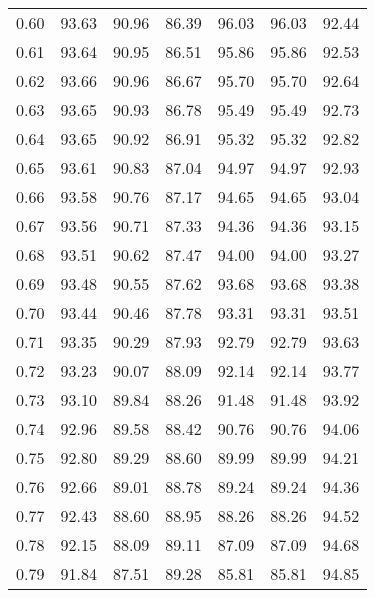 \begin{tabular}{|c|c|c|c|c|c|c|}
      0.60 &     93.63 &     90.96 &      86.39 &   96.03 &      96.03 &         92.44 \\
      0.61 &     93.64 &     90.95 &      86.51 &   95.86 &      95.86 &         92.53 \\
      0.62 &     93.66 &     90.96 &      86.67 &   95.70 &      95.70 &         92.64 \\
      0.63 &     93.65 &     90.93 &      86.78 &   95.49 &      95.49 &         92.73 \\
      0.64 &     93.65 &     90.92 &      86.91 &   95.32 &      95.32 &         92.82 \\
      0.65 &     93.61 &     90.83 &      87.04 &   94.97 &      94.97 &         92.93 \\
      0.66 &     93.58 &     90.76 &      87.17 &   94.65 &      94.65 &         93.04 \\
      0.67 &     93.56 &     90.71 &      87.33 &   94.36 &      94.36 &         93.15 \\
      0.68 &     93.51 &     90.62 &      87.47 &   94.00 &      94.00 &         93.27 \\
      0.69 &     93.48 &     90.55 &      87.62 &   93.68 &      93.68 &         93.38 \\
      0.70 &     93.44 &     90.46 &      87.78 &   93.31 &      93.31 &         93.51 \\
      0.71 &     93.35 &     90.29 &      87.93 &   92.79 &      92.79 &         93.63 \\
      0.72 &     93.23 &     90.07 &      88.09 &   92.14 &      92.14 &         93.77 \\
      0.73 &     93.10 &     89.84 &      88.26 &   91.48 &      91.48 &         93.92 \\
      0.74 &     92.96 &     89.58 &      88.42 &   90.76 &      90.76 &         94.06 \\
      0.75 &     92.80 &     89.29 &      88.60 &   89.99 &      89.99 &         94.21 \\
      0.76 &     92.66 &     89.01 &      88.78 &   89.24 &      89.24 &         94.36 \\
      0.77 &     92.43 &     88.60 &      88.95 &   88.26 &      88.26 &         94.52 \\
      0.78 &     92.15 &     88.09 &      89.11 &   87.09 &      87.09 &         94.68 \\
      0.79 &     91.84 &     87.51 &      89.28 &   85.81 &      85.81 &         94.85 \\

\end{tabular}
